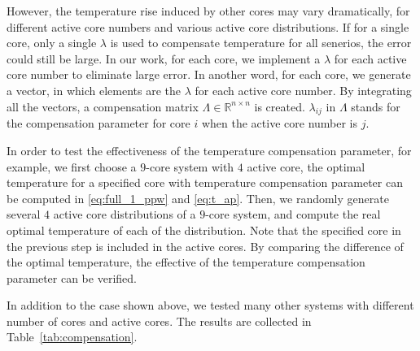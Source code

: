 However, the temperature rise induced by other cores may vary dramatically, for different active core numbers and various active core distributions. If for a single core, only a single $\lambda$ is used to compensate temperature for all senerios, the error could still be large. In our work, for each core, we implement a $\lambda$ for each active core number to eliminate large error. In another word, for each core, we generate a vector, in which elements are the $\lambda$ for each active core number. By integrating all the vectors, a compensation matrix $\Lambda \in \mathbb{R}^{n \times n}$ is created. $\lambda_{ij}$ in $\Lambda$ stands for the compensation parameter for core $i$ when the active core number is $j$.

In order to test the effectiveness of the temperature compensation parameter, for example, we first choose a $9$-core system with $4$ active core, the optimal temperature for a specified core with temperature compensation parameter can be computed in \eqref{eq:full_1_ppw} and \eqref{eq:t_ap}. Then, we randomly generate several $4$ active core distributions of a $9$-core system, and compute the real optimal temperature of each of the distribution. Note that the specified core in the previous step is included in the active cores. By comparing the difference of the optimal temperature, the effective of the temperature compensation parameter can be verified.

In addition to the case shown above, we tested many other systems with different number of cores and active cores. The results are collected in Table~\ref{tab:compensation}.

